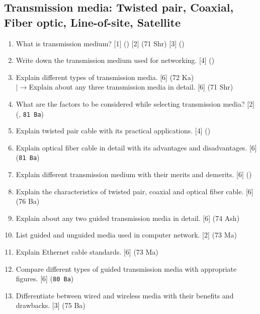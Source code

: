 \documentclass[12pt]{article}
\newcommand{\lb}{\\$\left|\rightarrow\right.$}
\begin{document}
	\subsection{Transmission media: Twisted pair, Coaxial, Fiber optic, Line-of-site, Satellite}
		\begin{enumerate}[noitemsep, topsep=0pt]
			\item What is transmission medium?  \hfill [1] () [2] (71 Shr) [3] ()
			
			\item Write down the transmission medium used for networking. \hfill [4] ()
			
			\item Explain different types of transmission media. \hfill [6] (72 Ka)
			\lb Explain about any three transmission media in detail. \hfill [6] (71 Shr)
			
			\item What are the factors to be considered while selecting transmission media? \hfill [2] (, \texttt{81 Ba})

			\item Explain twisted pair cable with its practical applications. \hfill [4] ()	
			
			\item Explain optical fiber cable in detail with its advantages and disadvantages. \hfill [6] (\texttt{81 Ba})
			
			\item Explain different transmission medium with their merits and demerits. \hfill [6] ()
			
			\item Explain the characteristics of twisted pair, coaxial and optical fiber cable. \hfill [6] (76 Ba)
			
			\item Explain about any two guided transmission media in detail. \hfill [6] (74 Ash)	
			
			\item List guided and unguided media used in computer network. \hfill [2] (73 Ma)
			
			\item Explain Ethernet cable standards. \hfill [6] (73 Ma)
			
			\item Compare different types of guided transmission media with appropriate figures. \hfill [6] (\texttt{80 Ba})
			
			\item Differentiate between wired and wireless media with their benefits and drawbacks. \hfill [3] (75 Ba)
			

\end{enumerate}
\end{document}
